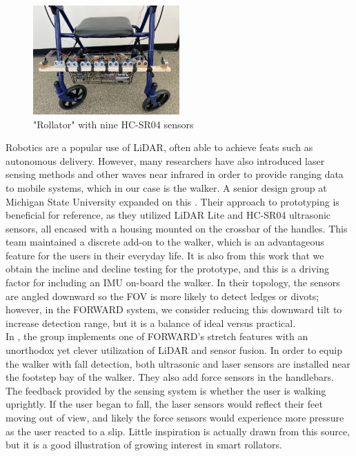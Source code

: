 \begin{figure}[H]
	\centering
	\includegraphics[width=0.5\textwidth]{./Images/mostafa9.png}
	\caption{\label{fig:mostafa9}"Rollator" with nine HC-SR04 sensors \cite{Mostofa}}
\end{figure}

\noindent Robotics are a popular use of LiDAR, often able to achieve feats such as autonomous delivery. However, many researchers have also introduced laser sensing methods and other waves near infrared in order to provide ranging data to mobile systems, which in our case is the walker. A senior design group at Michigan State University expanded on this \cite{mstate}. Their approach to prototyping is beneficial for reference, as they utilized LiDAR Lite and HC-SR04 ultrasonic sensors, all encased with a housing mounted on the crossbar of the handles. This team maintained a discrete add-on to the walker, which is an advantageous feature for the users in their everyday life. It is also from this work that we obtain the incline and decline testing for the prototype, and this is a driving factor for including an IMU on-board the walker. In their topology, the sensors are angled downward so the FOV is more likely to detect ledges or divots; however, in the FORWARD system, we consider reducing this downward tilt to increase detection range, but it is a balance of ideal versus practical.\\

\noindent In \cite{FallDetect}, the group implements one of FORWARD's stretch features with an unorthodox yet clever utilization of LiDAR and sensor fusion. In order to equip the walker with fall detection, both ultrasonic and laser sensors are installed near the footstep bay of the walker. They also add force sensors in the handlebars. The feedback provided by the sensing system is whether the user is walking uprightly. If the user began to fall, the laser sensors would reflect their feet moving out of view, and likely the force sensors would experience more pressure as the user reacted to a slip. Little inspiration is actually drawn from this source, but it is a good illustration of growing interest in smart rollators.\\

